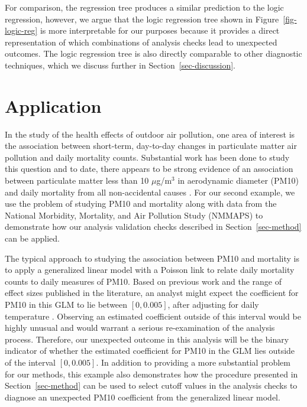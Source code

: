 \documentclass[
  12pt,
]{interact}
\begin{document}
For comparison, the regression tree produces a similar prediction to the
logic regression, however, we argue that the logic regression tree shown
in Figure~\ref{fig-logic-reg} is more interpretable for our purposes
because it provides a direct representation of which combinations of
analysis checks lead to unexpected outcomes. The logic regression tree
is also directly comparable to other diagnostic techniques, which we
discuss further in Section~\ref{sec-discussion}.

\section{Application}\label{sec-pm10-mortality}

In the study of the health effects of outdoor air pollution, one area of
interest is the association between short-term, day-to-day changes in
particulate matter air pollution and daily mortality counts. Substantial
work has been done to study this question and to date, there appears to
be strong evidence of an association between particulate matter less
than 10 \(\mu\)g/m\(^3\) in aerodynamic diameter (PM10) and daily
mortality from all non-accidental causes \citep{samet2000fine}. For our
second example, we use the problem of studying PM10 and mortality along
with data from the National Morbidity, Mortality, and Air Pollution
Study (NMMAPS) to demonstrate how our analysis validation checks
described in Section~\ref{sec-method} can be applied.

The typical approach to studying the association between PM10 and
mortality is to apply a generalized linear model with a Poisson link to
relate daily mortality counts to daily measures of PM10. Based on
previous work and the range of effect sizes published in the literature,
an analyst might expect the coefficient for PM10 in this GLM to lie
between \([0, 0.005]\), after adjusting for daily temperature
\citep{samet2000fine, welty2005acute}. Observing an estimated
coefficient outside of this interval would be highly unusual and would
warrant a serious re-examination of the analysis process. Therefore, our
unexpected outcome in this analysis will be the binary indicator of
whether the estimated coefficient for PM10 in the GLM lies outside of
the interval \([0, 0.005]\). In addition to providing a more substantial
problem for our methods, this example also demonstrates how the
procedure presented in Section~\ref{sec-method} can be used to select
cutoff values in the analysis checks to diagnose an unexpected PM10
coefficient from the generalized linear model.
\end{document}
